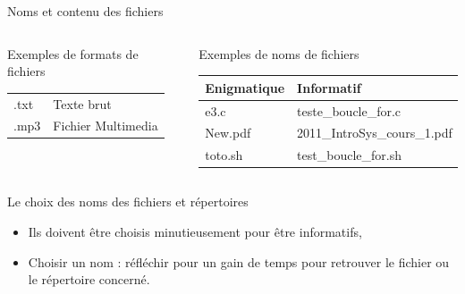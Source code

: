 \begin{frame}{Noms et contenu des fichiers}
\begin{columns}
\begin{column}{5.5cm}
\begin{block}{Exemples de formats de fichiers}
\begin{center}
\begin{tabular}{ll}
            .txt&Texte brut\\
            .mp3&Fichier Multimedia\\
            \hline
          \end{tabular}
        \end{center}
      \end{block}
    \end{column}
    \begin{column}{5.5cm}
      \begin{block}{Exemples de noms de fichiers}
        \begin{center}
          \begin{tabular}{ll}
            \hline
            Enigmatique&Informatif\\
            \hline
            e3.c&teste\_boucle\_for.c\\
            New.pdf&2011\_IntroSys\_cours\_1.pdf\\
            toto.sh&test\_boucle\_for.sh\\
            \hline
          \end{tabular}
        \end{center}
      \end{block}
      \vrule
    \end{column}
  \end{columns}
  \begin{alertblock}{Le choix des noms des fichiers et répertoires}
    \begin{itemize}
    \item Ils doivent être choisis minutieusement pour être informatifs,
    \item Choisir un nom : réfléchir pour un gain de temps pour
      retrouver le fichier ou le répertoire concerné.
    \end{itemize}
  \end{alertblock}
\end{frame}
